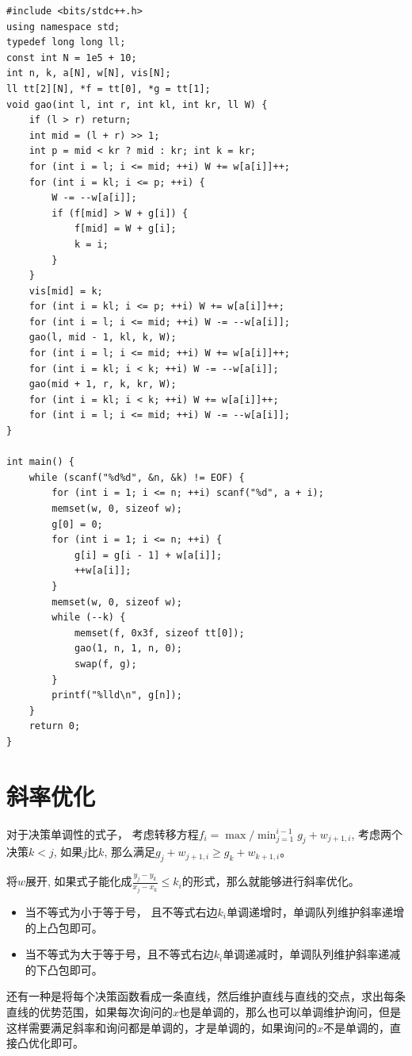 \begin{lstlisting}
#include <bits/stdc++.h>
using namespace std;
typedef long long ll;
const int N = 1e5 + 10;
int n, k, a[N], w[N], vis[N];
ll tt[2][N], *f = tt[0], *g = tt[1]; 
void gao(int l, int r, int kl, int kr, ll W) {
	if (l > r) return;
	int mid = (l + r) >> 1; 
	int p = mid < kr ? mid : kr; int k = kr;  
	for (int i = l; i <= mid; ++i) W += w[a[i]]++; 
	for (int i = kl; i <= p; ++i) {
		W -= --w[a[i]];
		if (f[mid] > W + g[i]) {
			f[mid] = W + g[i];
			k = i;
		}
	}
	vis[mid] = k;
	for (int i = kl; i <= p; ++i) W += w[a[i]]++;
	for (int i = l; i <= mid; ++i) W -= --w[a[i]];
	gao(l, mid - 1, kl, k, W);
	for (int i = l; i <= mid; ++i) W += w[a[i]]++;
	for (int i = kl; i < k; ++i) W -= --w[a[i]];
	gao(mid + 1, r, k, kr, W);
	for (int i = kl; i < k; ++i) W += w[a[i]]++;
	for (int i = l; i <= mid; ++i) W -= --w[a[i]];
}

int main() {
	while (scanf("%d%d", &n, &k) != EOF) {
		for (int i = 1; i <= n; ++i) scanf("%d", a + i);
		memset(w, 0, sizeof w);
		g[0] = 0;
		for (int i = 1; i <= n; ++i) {
			g[i] = g[i - 1] + w[a[i]];
			++w[a[i]];
		}
		memset(w, 0, sizeof w);
		while (--k) {
			memset(f, 0x3f, sizeof tt[0]);
			gao(1, n, 1, n, 0);
			swap(f, g);
		}
		printf("%lld\n", g[n]); 
	}
	return 0;
}
\end{lstlisting}

\section{斜率优化}

对于决策单调性的式子， 考虑转移方程$\displaystyle f_i= \max / \min_{j=1}^{i-1}g_j+w_{j + 1,i}$, 考虑两个决策$k < j$, 如果$j$比$k$, 那么满足$\displaystyle g_j + w_{j + 1, i} \geq g_k + w_{k + 1, i}$。\par
将$w$展开, 如果式子能化成$\displaystyle \frac{y_j - y_k}{x_j - x_k} \leq k_i$的形式，那么就能够进行斜率优化。\par

\begin{itemize}
\item 当不等式为小于等于号， 且不等式右边$k_i$单调递增时，单调队列维护斜率递增的上凸包即可。
\item 当不等式为大于等于号，且不等式右边$k_i$单调递减时，单调队列维护斜率递减的下凸包即可。
\end{itemize}

还有一种是将每个决策函数看成一条直线，然后维护直线与直线的交点，求出每条直线的优势范围，如果每次询问的$x$也是单调的，那么也可以单调维护询问，但是这样需要满足斜率和询问都是单调的，才是单调的，如果询问的$x$不是单调的，直接凸优化即可。\par

